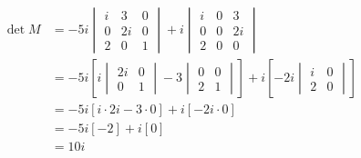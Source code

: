 \begin{align*}
	\det M
	 & = -5i\begin{vmatrix}
		        i & 3  & 0 \\
		        0 & 2i & 0 \\
		        2 & 0  & 1
	        \end{vmatrix} + i\begin{vmatrix}
		                         i & 0 & 3  \\
		                         0 & 0 & 2i \\
		                         2 & 0 & 0
	                         \end{vmatrix}                                                \\
	 & = -5i\left[i\begin{vmatrix}
			               2i & 0 \\
			               0  & 1
		               \end{vmatrix} - 3 \begin{vmatrix}
			                                 0 & 0 \\
			                                 2 & 1
		                                 \end{vmatrix}\right] + i\left[-2i\begin{vmatrix}
			                                                                  i & 0 \\
			                                                                  2 & 0
		                                                                  \end{vmatrix}\right] \\
	 & = -5i[i \cdot 2i - 3 \cdot 0] + i[-2i \cdot 0]                                      \\
	 & = -5i[-2] + i[0]                                                                    \\
	 & = 10i
\end{align*}

